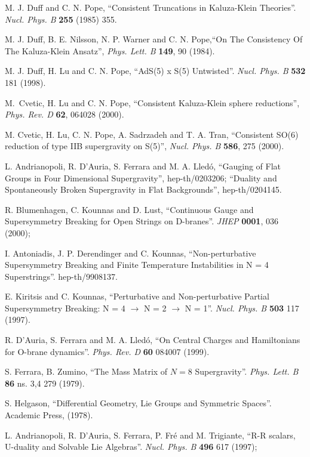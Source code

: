 \documentclass[a4paper,12pt]{article}
\begin{document}
\begin{thebibliography}{99}

M. J. Duff and C. N. Pope, ``Consistent Truncations in
Kaluza-Klein Theories''. {\it Nucl. Phys. B }{\bf 255} (1985) 355.

M. J. Duff, B. E. Nilsson, N. P. Warner and C. N. Pope,``On The
Consistency Of The Kaluza-Klein Ansatz'', {\it Phys. Lett. B} {\bf
149}, 90 (1984).


M. J. Duff, H. Lu and C. N. Pope, ``AdS(5) x S(5) Untwisted''.
{\it Nucl. Phys. B} {\bf 532} 181  (1998).

M.~Cvetic, H. Lu and C. N. Pope, ``Consistent Kaluza-Klein sphere
reductions'', {\it Phys. Rev. D} {\bf 62}, 064028 (2000).


M. Cvetic, H. Lu, C. N. Pope, A. Sadrzadeh and T. A. Tran,
``Consistent SO(6) reduction of type IIB supergravity on S(5)'',
{\it Nucl.  Phys.  B}  {\bf 586}, 275 (2000).

 L. Andrianopoli, R. D'Auria, S. Ferrara and M. A. Lled\'o,
``Gauging of Flat Groups in Four Dimensional Supergravity'',
hep-th/0203206; ``Duality and Spontaneously Broken Supergravity in
Flat Backgrounds'', hep-th/0204145.




R. Blumenhagen, C. Kounnas and D. Lust, ``Continuous Gauge and
Supersymmetry Breaking for Open Strings on  D-branes''. {\it JHEP}
{\bf 0001}, 036 (2000);

I. Antoniadis, J. P. Derendinger and C. Kounnas,
``Non-perturbative Supersymmetry Breaking and Finite Temperature
Instabilities in N = 4 Superstrings''. hep-th/9908137.


 E. Kiritsis and C. Kounnas, ``Perturbative and Non-perturbative
Partial Supersymmetry Breaking:  N = 4 $\to$ N = 2 $\to$ N = 1''.
{\it Nucl. Phys. B }{\bf 503} 117 (1997).






 R. D'Auria, S. Ferrara and M. A. Lled\'o,
``On Central Charges and Hamiltonians for O-brane dynamics''. {\it Phys. Rev. D} {\bf 60}
 084007 (1999).


 S. Ferrara, B. Zumino, ``The Mass Matrix of $N=8$ Supergravity''. {\it Phys. Lett. B} {\bf 86} ns. 3,4 279 (1979).


 S. Helgason, ``Differential Geometry, Lie Groups and Symmetric Spaces''. Academic Press, (1978).

L. Andrianopoli, R. D'Auria, S. Ferrara, P. Fr\'e and M.
Trigiante, ``R-R scalars, U-duality and Solvable Lie Algebras''.
{\it Nucl.  Phys.  B}  {\bf 496} 617 (1997);


\end{thebibliography}
\end{document}

